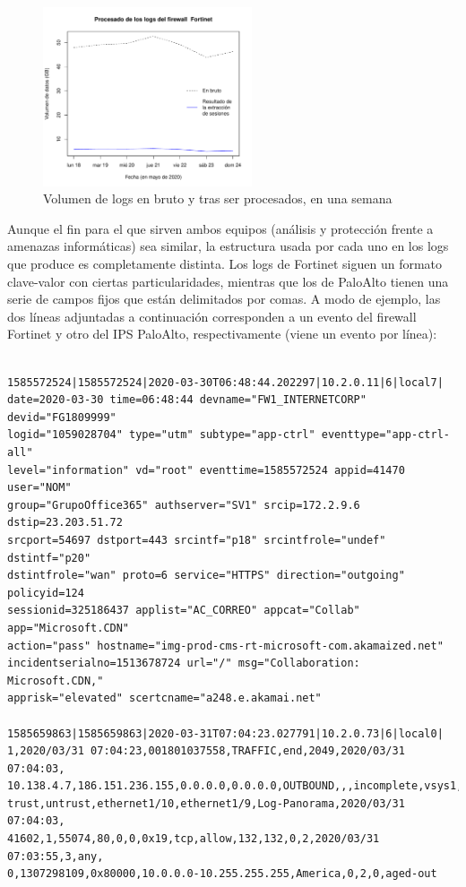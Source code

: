 \begin{figure}[h]
    \centering
    \includegraphics[width=0.55\textwidth]{contenido/fig/volumen_logs.pdf}
    \caption{Volumen de logs en bruto y tras ser procesados, en una semana}
    \label{fig:volumenlogs}
\end{figure}

Aunque el fin para el que sirven ambos equipos (análisis y protección frente a amenazas informáticas) sea similar,
la estructura usada por cada uno en los logs que produce es completamente distinta.
Los logs de Fortinet siguen un formato clave-valor con ciertas particularidades, mientras que los de PaloAlto tienen una serie de campos fijos que están delimitados por comas.
A modo de ejemplo, las dos líneas adjuntadas a continuación corresponden a un evento del firewall Fortinet y otro del IPS PaloAlto, respectivamente (viene un evento por línea):

\begingroup
\makeatletter
\@totalleftmargin=-1cm
\begin{verbatim}

1585572524|1585572524|2020-03-30T06:48:44.202297|10.2.0.11|6|local7|
date=2020-03-30 time=06:48:44 devname="FW1_INTERNETCORP" devid="FG1809999"
logid="1059028704" type="utm" subtype="app-ctrl" eventtype="app-ctrl-all"
level="information" vd="root" eventtime=1585572524 appid=41470 user="NOM"
group="GrupoOffice365" authserver="SV1" srcip=172.2.9.6 dstip=23.203.51.72
srcport=54697 dstport=443 srcintf="p18" srcintfrole="undef" dstintf="p20"
dstintfrole="wan" proto=6 service="HTTPS" direction="outgoing" policyid=124
sessionid=325186437 applist="AC_CORREO" appcat="Collab" app="Microsoft.CDN"
action="pass" hostname="img-prod-cms-rt-microsoft-com.akamaized.net"
incidentserialno=1513678724 url="/" msg="Collaboration: Microsoft.CDN,"
apprisk="elevated" scertcname="a248.e.akamai.net"

1585659863|1585659863|2020-03-31T07:04:23.027791|10.2.0.73|6|local0|
1,2020/03/31 07:04:23,001801037558,TRAFFIC,end,2049,2020/03/31 07:04:03,
10.138.4.7,186.151.236.155,0.0.0.0,0.0.0.0,OUTBOUND,,,incomplete,vsys1,
trust,untrust,ethernet1/10,ethernet1/9,Log-Panorama,2020/03/31 07:04:03,
41602,1,55074,80,0,0,0x19,tcp,allow,132,132,0,2,2020/03/31 07:03:55,3,any,
0,1307298109,0x80000,10.0.0.0-10.255.255.255,America,0,2,0,aged-out

\end{verbatim}
\endgroup

